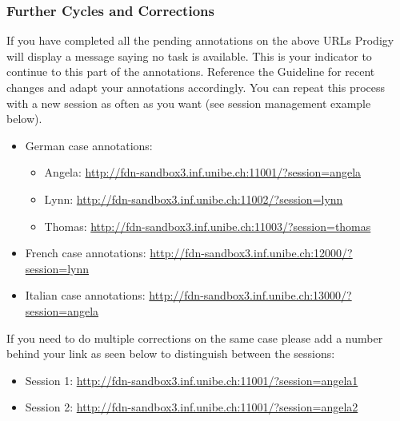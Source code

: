 \documentclass{article}
\begin{document}
\subsubsection{Further Cycles and Corrections}\label{2_cycle}
If you have completed all the pending annotations on the above URLs Prodigy will display a message saying no task is available. This is your indicator to continue to this part of the annotations. Reference the Guideline for recent changes and adapt your annotations accordingly. You can repeat this process with a new session as often as you want (see session management example below).
\begin{itemize}
\item German case annotations:
\begin{itemize}
\item Angela: \href{http://fdn-sandbox3.inf.unibe.ch:11001/?session=angela}{http://fdn-sandbox3.inf.unibe.ch:11001/?session=angela}
    \item Lynn: \href{http://fdn-sandbox3.inf.unibe.ch:11002/?session=lynn}{http://fdn-sandbox3.inf.unibe.ch:11002/?session=lynn}
    \item Thomas: \href{http://fdn-sandbox3.inf.unibe.ch:11003/?session=thomas}{http://fdn-sandbox3.inf.unibe.ch:11003/?session=thomas}

\end{itemize}
\item French case annotations: \href{http://fdn-sandbox3.inf.unibe.ch:12001/?session=lynn}{http://fdn-sandbox3.inf.unibe.ch:12000/?session=lynn}
    \item Italian case annotations: \href{http://fdn-sandbox3.inf.unibe.ch:13001/?session=angela}{http://fdn-sandbox3.inf.unibe.ch:13000/?session=angela}
\end{itemize}




If you need to do multiple corrections on the same case please add a number behind your link as seen below to distinguish between the sessions:

\begin{itemize}
\item Session 1: \href{http://fdn-sandbox3.inf.unibe.ch:11001/?session=angela1}{http://fdn-sandbox3.inf.unibe.ch:11001/?session=angela1}
\item Session 2: \href{http://fdn-sandbox3.inf.unibe.ch:11001/?session=angela2}{http://fdn-sandbox3.inf.unibe.ch:11001/?session=angela2}
\end{itemize}
\end{document}
